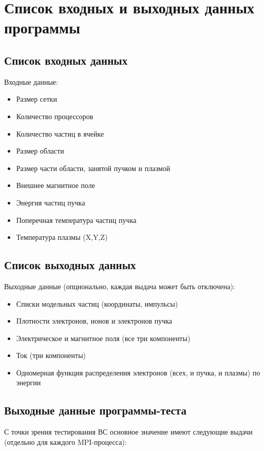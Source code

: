 \section{Список входных и выходных данных программы}	

\subsection{Список входных данных}
Входные данные:
\begin{itemize}
\item Размер сетки
\item Количество процессоров
\item Количество частиц в ячейке
\item Размер области
\item Размер части области, занятой пучком и плазмой
\item Внешнее магнитное поле
\item Энергия частиц пучка
\item Поперечная температура частиц пучка
\item Температура плазмы (X,Y,Z)
\end{itemize}

\subsection{Список выходных данных}
Выходные данные (опционально, каждая выдача может быть отключена):
\begin{itemize}
\item Списки модельных частиц (координаты, импульсы)
\item Плотности электронов, ионов и электронов пучка
\item Электрическое и магнитное поля (все три компоненты)
\item Ток (три компоненты)
\item Одномерная функция распределения электронов (всех, и пучка, и плазмы) по энергии
\end{itemize}

\subsection{Выходные данные программы-теста}
С точки зрения тестирования ВС основное значение имеют следующие выдачи (отдельно для каждого MPI-процесса):


